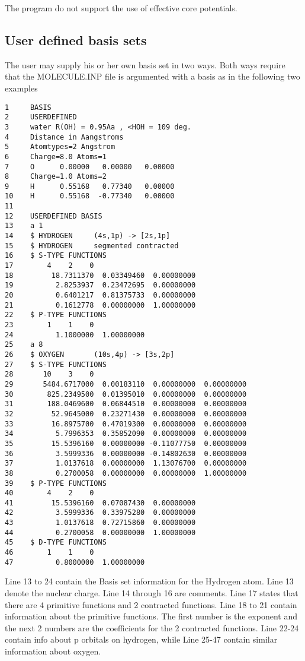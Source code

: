 The {\lsdalton} program do not support the use of effective core potentials.

\subsection{User defined basis sets}
\label{sub:USERDEFINER}

The user may supply his or her own basis set in two ways. Both ways require that the MOLECULE.INP file is argumented with a basis as in the following two examples

\begin{verbatim}
1     BASIS
2     USERDEFINED
3     water R(OH) = 0.95Aa , <HOH = 109 deg.
4     Distance in Aangstroms
5     Atomtypes=2 Angstrom
6     Charge=8.0 Atoms=1
7     O      0.00000   0.00000   0.00000
8     Charge=1.0 Atoms=2
9     H      0.55168   0.77340   0.00000
10    H      0.55168  -0.77340   0.00000
11 
12    USERDEFINED BASIS
13    a 1
14    $ HYDROGEN     (4s,1p) -> [2s,1p]
15    $ HYDROGEN     segmented contracted
16    $ S-TYPE FUNCTIONS
17        4    2    0
18         18.7311370  0.03349460  0.00000000
19          2.8253937  0.23472695  0.00000000
20          0.6401217  0.81375733  0.00000000
21          0.1612778  0.00000000  1.00000000
22    $ P-TYPE FUNCTIONS
23        1    1    0
24          1.1000000  1.00000000
25    a 8
26    $ OXYGEN       (10s,4p) -> [3s,2p]                               
27    $ S-TYPE FUNCTIONS
28       10    3    0
29       5484.6717000  0.00183110  0.00000000  0.00000000
30        825.2349500  0.01395010  0.00000000  0.00000000
31        188.0469600  0.06844510  0.00000000  0.00000000
32         52.9645000  0.23271430  0.00000000  0.00000000
33         16.8975700  0.47019300  0.00000000  0.00000000
34          5.7996353  0.35852090  0.00000000  0.00000000
35         15.5396160  0.00000000 -0.11077750  0.00000000
36          3.5999336  0.00000000 -0.14802630  0.00000000
37          1.0137618  0.00000000  1.13076700  0.00000000
38          0.2700058  0.00000000  0.00000000  1.00000000
39    $ P-TYPE FUNCTIONS
40        4    2    0
41         15.5396160  0.07087430  0.00000000
42          3.5999336  0.33975280  0.00000000
43          1.0137618  0.72715860  0.00000000
44          0.2700058  0.00000000  1.00000000
45    $ D-TYPE FUNCTIONS
46        1    1    0
47          0.8000000  1.00000000
\end{verbatim} 
Line 13 to 24 contain the Basis set information for the Hydrogen atom. 
Line 13 denote the nuclear charge. Line 14 through 16 are comments. Line 17 states 
that there are 4 primitive functions and 2 contracted functions.
Line 18 to 21 contain information about the primitive functions. The first number is the exponent 
and the next 2 numbers are the coefficients for the 2 contracted functions.
Line 22-24 contain info about p orbitals on hydrogen, while Line 25-47 contain similar information 
about oxygen.

